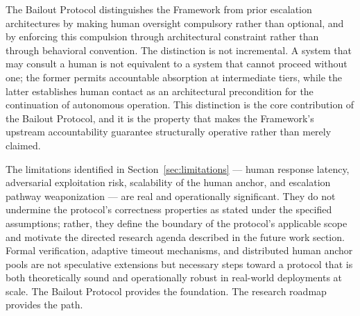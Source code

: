 The Bailout Protocol distinguishes the \bxthree{} Framework from prior escalation architectures by making human oversight compulsory rather than optional, and by enforcing this compulsion through architectural constraint rather than through behavioral convention. The distinction is not incremental. A system that may consult a human is not equivalent to a system that cannot proceed without one; the former permits accountable absorption at intermediate tiers, while the latter establishes human contact as an architectural precondition for the continuation of autonomous operation. This distinction is the core contribution of the Bailout Protocol, and it is the property that makes the \bxthree{} Framework's upstream accountability guarantee structurally operative rather than merely claimed.

The limitations identified in Section~\ref{sec:limitations} --- human response latency, adversarial exploitation risk, scalability of the human anchor, and escalation pathway weaponization --- are real and operationally significant. They do not undermine the protocol's correctness properties as stated under the specified assumptions; rather, they define the boundary of the protocol's applicable scope and motivate the directed research agenda described in the future work section. Formal verification, adaptive timeout mechanisms, and distributed human anchor pools are not speculative extensions but necessary steps toward a protocol that is both theoretically sound and operationally robust in real-world deployments at scale. The Bailout Protocol provides the foundation. The research roadmap provides the path.